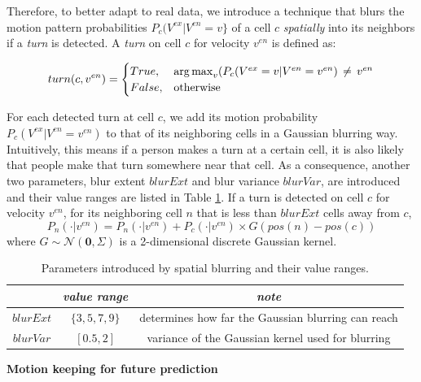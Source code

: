 Therefore, to better adapt to real data, we introduce a technique that blurs the motion pattern probabilities  \( P_c(V^{ex} | V^{en}=v\} \) of a cell $c$ \textit{spatially} into its neighbors if a \textit{turn} is detected. A \textit{turn} on cell $c$ for velocity $v^{en}$ is defined as:

\[ 
turn(c, v^{en}) = 
\begin{cases}
    True , &  \operatorname*{arg\,max}_v (P_c(V^{ex}=v | V^{en}=v^{en}) \, \neq \, v^{en} \\
    False,              & \text{otherwise}
\end{cases}
 \]


For each detected turn at cell $c$, we add its motion probability $P_c(V^{ex} | V^{en}=v^{en})$ to that of its neighboring cells in a Gaussian blurring way. Intuitively, this means if a person makes a turn at a certain cell, it is also likely that people make that turn somewhere near that cell. As a consequence, another two parameters, blur extent \( blurExt \) and blur variance  \( blurVar \), are introduced and their value ranges are listed in Table \ref{table:spatial_blur_param_range}. If a turn is detected on cell $c$ for velocity $v^{en}$, for its neighboring cell $n$ that is less than $blurExt$ cells away from $c$,
\begin{equation}
P_n(\cdot| v^{en}) = P_n(\cdot| v^{en})  + P_c(\cdot| v^{en}) \times G(pos(n)-pos(c))
\end{equation}
where $G \sim \mathcal{N}(\mathbf{0}, \Sigma)$ is a 2-dimensional discrete Gaussian kernel.
\begin{table}[H]
\centering  
\begin{tabularx}{.8\textwidth}{c|c|c}
    \hline
      &  \textit{value range } & \textit{note} \\ \hline
    \( blurExt \) & \( \{3, 5, 7, 9\} \) & \footnotesize{determines how far the Gaussian blurring can reach} \\
     \( blurVar \) & \( [0.5, 2]\) & \footnotesize{ variance of the Gaussian kernel used for blurring} \\   
   \hline
  \end{tabularx}
\caption{Parameters introduced by spatial blurring and their value ranges.}
\label{table:spatial_blur_param_range}
\end{table}

\textbf{Motion keeping for future prediction}

